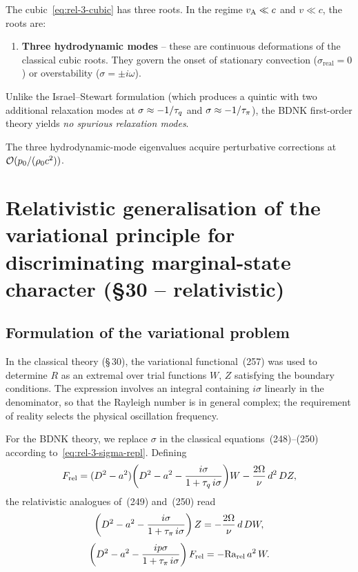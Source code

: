 The cubic~\eqref{eq:rel-3-cubic} has three roots.  In the regime
$v_{\mathrm{A}} \ll c$ and $v \ll c$, the roots are:
\begin{enumerate}
  \item \textbf{Three hydrodynamic modes} -- these are continuous
    deformations of the classical cubic roots.  They govern the
    onset of stationary convection ($\sigma_{\mathrm{real}} = 0$) or
    overstability ($\sigma = \pm i\omega$).
\end{enumerate}
Unlike the Israel--Stewart formulation (which produces a quintic with
two additional relaxation modes at $\sigma \approx -1/\tau_{q}$ and
$\sigma \approx -1/\tau_{\pi}$), the BDNK first-order theory yields
\emph{no spurious relaxation modes}.

The three hydrodynamic-mode eigenvalues acquire perturbative corrections
at $\mathcal{O}(p_{0}/(\rho_0 c^{2}))$.


\section{Relativistic generalisation of the variational principle for
  discriminating marginal-state character (\S30 -- relativistic)}
\label{sec:rel-3-30}

\subsection{Formulation of the variational problem}

In the classical theory (\S\,30), the variational functional~(257) was
used to determine $R$ as an extremal over trial functions $W$, $Z$
satisfying the boundary conditions.  The expression involves an
integral containing $i\sigma$ linearly in the denominator, so that
the Rayleigh number is in general complex; the requirement of reality
selects the physical oscillation frequency.

For the BDNK theory, we replace $\sigma$ in the classical
equations~(248)--(250) according to~\eqref{eq:rel-3-sigma-repl}.
Defining
\begin{equation}\label{eq:rel-3-F-def}
  F_{\mathrm{rel}}
  = (D^{2}-a^{2})
    \!\left(D^{2}-a^{2}-\frac{i\sigma}{1+\tau_{q}\,i\sigma}\right)\!W
  - \frac{2\Omega}{\nu}\,d^{2}\,DZ,
\end{equation}
the relativistic analogues of~(249) and~(250) read
\begin{equation}\label{eq:rel-3-Z-eq}
  \left(D^{2}-a^{2}-\frac{i\sigma}{1+\tau_{\pi}\,i\sigma}\right)Z
  = -\frac{2\Omega}{\nu}\,d\,DW,
\end{equation}
\begin{equation}\label{eq:rel-3-F-eq}
  \left(D^{2}-a^{2}-\frac{ip\sigma}{1+\tau_{\pi}\,i\sigma}\right)F_{\mathrm{rel}}
  = -\mathrm{Ra}_{\mathrm{rel}}\,a^{2}\,W.
\end{equation}

